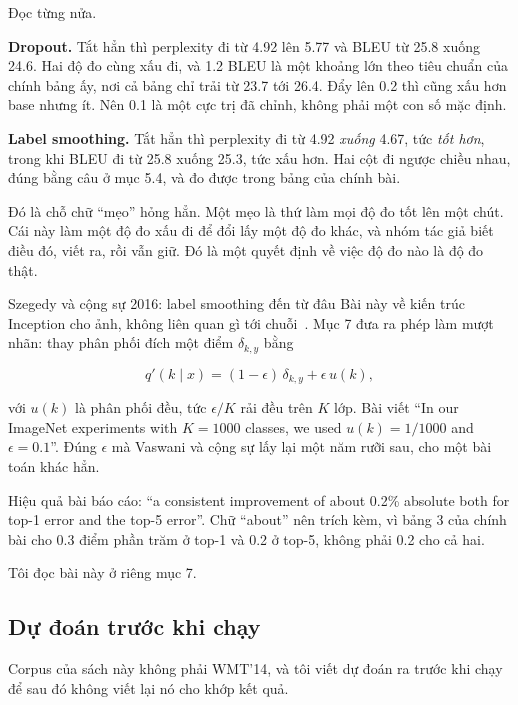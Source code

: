 Đọc từng nửa.

\textbf{Dropout.} Tắt hẳn thì perplexity đi từ 4.92 lên 5.77 và BLEU từ 25.8
xuống 24.6. Hai độ đo cùng xấu đi, và 1.2 BLEU là một khoảng lớn theo tiêu chuẩn
của chính bảng ấy, nơi cả bảng chỉ trải từ 23.7 tới 26.4. Đẩy lên 0.2 thì cũng
xấu hơn base nhưng ít. Nên 0.1 là một cực trị đã chỉnh, không phải một con số
mặc định.

\textbf{Label smoothing.} Tắt hẳn thì perplexity đi từ 4.92 \emph{xuống} 4.67,
tức \emph{tốt hơn}, trong khi BLEU đi từ 25.8 xuống 25.3, tức xấu hơn. Hai cột
đi ngược chiều nhau, đúng bằng câu ở mục 5.4, và đo được trong bảng của chính
bài.

Đó là chỗ chữ \enquote{mẹo} hỏng hẳn. Một mẹo là thứ làm mọi độ đo tốt lên một
chút. Cái này làm một độ đo xấu đi để đổi lấy một độ đo khác, và nhóm tác giả
biết điều đó, viết ra, rồi vẫn giữ. Đó là một quyết định về việc độ đo nào là độ
đo thật.

\begin{bridge}{Szegedy và cộng sự 2016: label smoothing đến từ đâu}
%
Bài này về kiến trúc Inception cho ảnh, không liên quan gì tới
chuỗi~\autocite{szegedy2016rethinking}. Mục 7 đưa ra phép làm mượt nhãn: thay
phân phối đích một điểm \(\delta_{k,y}\) bằng

\begin{equation*}
  q'(k \mid x) = (1 - \epsilon)\,\delta_{k,y} + \epsilon\, u(k),
\end{equation*}

với \(u(k)\) là phân phối đều, tức \(\epsilon/K\) rải đều trên \(K\) lớp. Bài
viết \enquote{In our ImageNet experiments with \(K = 1000\) classes, we used
\(u(k) = 1/1000\) and \(\epsilon = 0.1\)}. Đúng \(\epsilon\) mà Vaswani và cộng
sự lấy lại một năm rưỡi sau, cho một bài toán khác hẳn.

Hiệu quả bài báo cáo: \enquote{a consistent improvement of about 0.2\% absolute
both for top-1 error and the top-5 error}. Chữ \enquote{about} nên trích kèm,
vì bảng 3 của chính bài cho 0.3 điểm phần trăm ở top-1 và 0.2 ở top-5, không
phải 0.2 cho cả hai.

Tôi đọc bài này ở riêng mục 7.
\end{bridge}

\subsection*{Dự đoán trước khi chạy}

%
Corpus của sách này không phải WMT'14, và tôi viết dự đoán ra trước khi chạy để
sau đó không viết lại nó cho khớp kết quả.

